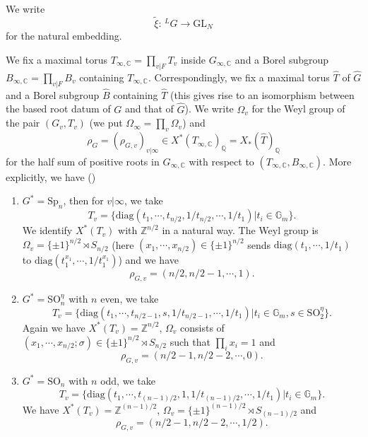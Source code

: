 \documentclass[12pt,oneside,reqno]{amsart}
\newcommand{\C}{\mathbb{C}}
\newcommand{\G}{\mathbb{G}}
\newcommand{\Q}{\mathbb{Q}}
\newcommand{\Z}{\mathbb{Z}}
\theoremstyle{plain}
\begin{document}
	
	
	
	
	
	
	We write
	\begin{equation}\label{xi: ^LG to GL_N}
		\widetilde{\xi}
		\colon\,^LG\to\mathrm{GL}_N
	\end{equation}
	for the natural embedding.
	
	
	
	
	We fix a maximal torus $T_{\infty,\C}=\prod_{v|F}T_{v}$ inside $G_{\infty,\C}$ and a Borel subgroup $B_{\infty,\C}=\prod_{v|F}B_v$ containing $T_{\infty,\C}$. Correspondingly, we fix a maximal torus $\widehat{T}$ of $\widehat{G}$ and a Borel subgroup $\widehat{B}$ containing $\widehat{T}$ (this gives rise to an isomorphism between the based root datum of $G$ and that of $\widehat{G}$). We write $\Omega_v$ for the Weyl group of the pair $(G_v,T_v)$ (we put $\Omega_\infty=\prod_v\Omega_v$) and
	\[
	\rho_G=(\rho_{G,v})_{v|\infty}\in
	X^\ast(T_{\infty,\C})_\Q=X_\ast(\widehat{T})_\Q
	\]
	for the half sum of positive roots in $G_{\infty,\C}$ with respect to $(T_{\infty,\C},B_{\infty,\C})$. More explicitly, we have (\cite[§2.1]{Shin2024})
	\begin{enumerate}
		\item 
		$G^\ast=\mathrm{Sp}_n$, then for $v|\infty$, we take
		\[
		T_{v}=\{\mathrm{diag}(t_1,\cdots,t_{n/2},1/t_{n/2},\cdots,1/t_1)|t_i\in\mathbb{G}_m\}.
		\]
		We identify $X^\ast(T_v)$ with $\Z^{n/2}$ in a natural way. The Weyl group is $\Omega_v=\{\pm1\}^{n/2}\rtimes S_{n/2}$ (here $(x_1,\cdots,x_{n/2})\in\{\pm1\}^{n/2}$ sends $\mathrm{diag}(t_1,\cdots,1/t_1)$ to $\mathrm{diag}(t_1^{x_1},\cdots,1/t_1^{x_1})$) and we have
		\[
		\rho_{G,v}=(n/2,n/2-1,\cdots,1).
		\]
		
		
		\item 
		$G^\ast=\mathrm{SO}_n^\eta$ with $n$ even, we take
		\[
		T_v=\{\mathrm{diag}(t_1,\cdots,t_{n/2-1},s,1/t_{n/2-1},\cdots,1/t_1)|t_i\in\G_m,s\in\mathrm{SO}_2^\eta\}.
		\]
		Again we have $X^\ast(T_v)=\Z^{n/2}$, $\Omega_v$ consists of $(x_1,\cdots,x_{n/2};\sigma)\in\{\pm1\}^{n/2}\rtimes S_{n/2}$ such that $\prod_ix_i=1$ and
		\[
		\rho_{G,v}=(n/2-1,n/2-2,\cdots,0).
		\]
		
		
		
		\item 
		$G^\ast=\mathrm{SO}_n$ with $n$ odd, we take
		\[
		T_v=\{\mathrm{diag}(t_1,\cdots,t_{(n-1)/2},1,1/t_{(n-1)/2},\cdots,1/t_1)|t_i\in\G_m\}.
		\]
		We have $X^\ast(T_v)=\Z^{(n-1)/2}$, $\Omega_v=\{\pm1\}^{(n-1)/2}\rtimes S_{(n-1)/2}$ and
		\[
		\rho_{G,v}
		=
		(n/2-1,n/2-2,\cdots,1/2).
		\]
	\end{enumerate}
	
\end{document}
